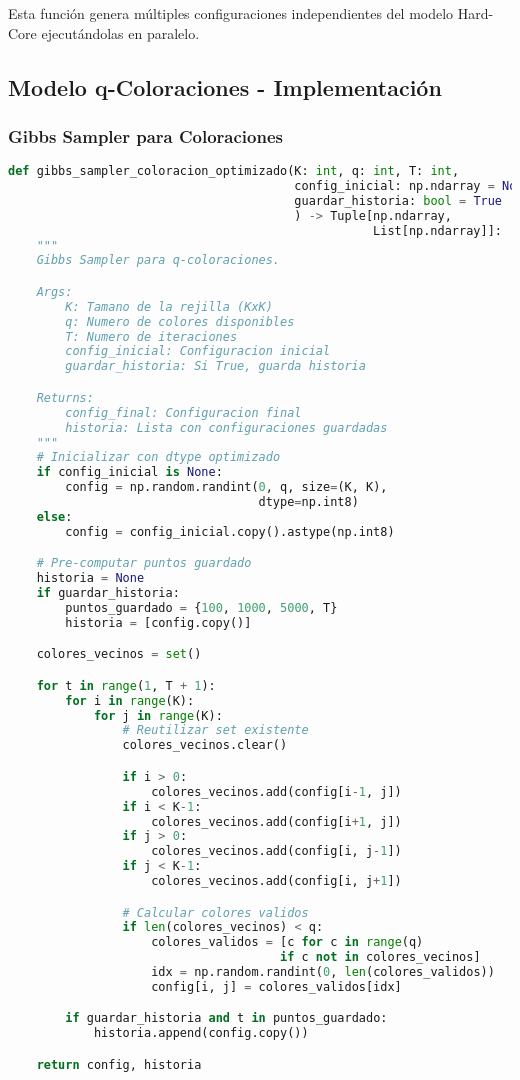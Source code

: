 Esta función genera múltiples configuraciones independientes del modelo Hard-Core ejecutándolas en paralelo. 

\subsection{Modelo q-Coloraciones - Implementación}

\subsubsection{Gibbs Sampler para Coloraciones}

\begin{lstlisting}[language=Python]
def gibbs_sampler_coloracion_optimizado(K: int, q: int, T: int,
                                        config_inicial: np.ndarray = None,
                                        guardar_historia: bool = True
                                        ) -> Tuple[np.ndarray,
                                                   List[np.ndarray]]:
    """
    Gibbs Sampler para q-coloraciones.

    Args:
        K: Tamano de la rejilla (KxK)
        q: Numero de colores disponibles
        T: Numero de iteraciones
        config_inicial: Configuracion inicial
        guardar_historia: Si True, guarda historia

    Returns:
        config_final: Configuracion final
        historia: Lista con configuraciones guardadas
    """
    # Inicializar con dtype optimizado
    if config_inicial is None:
        config = np.random.randint(0, q, size=(K, K),
                                   dtype=np.int8)
    else:
        config = config_inicial.copy().astype(np.int8)

    # Pre-computar puntos guardado
    historia = None
    if guardar_historia:
        puntos_guardado = {100, 1000, 5000, T}
        historia = [config.copy()]

    colores_vecinos = set()

    for t in range(1, T + 1):
        for i in range(K):
            for j in range(K):
                # Reutilizar set existente
                colores_vecinos.clear()

                if i > 0:
                    colores_vecinos.add(config[i-1, j])
                if i < K-1:
                    colores_vecinos.add(config[i+1, j])
                if j > 0:
                    colores_vecinos.add(config[i, j-1])
                if j < K-1:
                    colores_vecinos.add(config[i, j+1])

                # Calcular colores validos
                if len(colores_vecinos) < q:
                    colores_validos = [c for c in range(q)
                                      if c not in colores_vecinos]
                    idx = np.random.randint(0, len(colores_validos))
                    config[i, j] = colores_validos[idx]

        if guardar_historia and t in puntos_guardado:
            historia.append(config.copy())

    return config, historia
\end{lstlisting}


